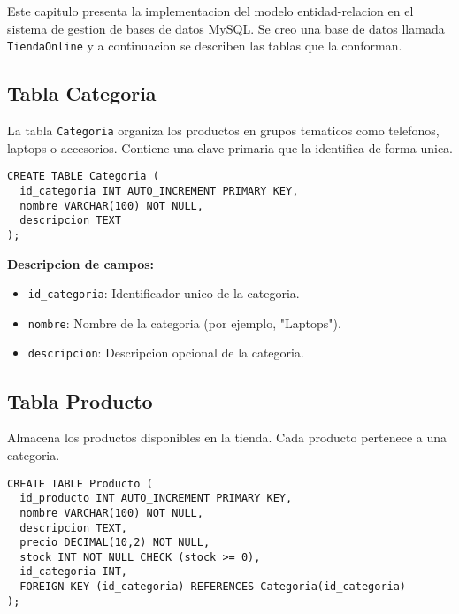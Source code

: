 






Este capitulo presenta la implementacion del modelo entidad-relacion en el sistema de gestion de bases de datos MySQL. Se creo una base de datos llamada \texttt{TiendaOnline} y a continuacion se describen las tablas que la conforman.

\subsection{Tabla Categoria}

La tabla \texttt{Categoria} organiza los productos en grupos tematicos como telefonos, laptops o accesorios. Contiene una clave primaria que la identifica de forma unica.

\begin{lstlisting}
CREATE TABLE Categoria (
  id_categoria INT AUTO_INCREMENT PRIMARY KEY,
  nombre VARCHAR(100) NOT NULL,
  descripcion TEXT
);
\end{lstlisting}

\textbf{Descripcion de campos:}

\begin{itemize}
  \item \texttt{id\_categoria}: Identificador unico de la categoria.
  \item \texttt{nombre}: Nombre de la categoria (por ejemplo, "Laptops").
  \item \texttt{descripcion}: Descripcion opcional de la categoria.
\end{itemize}

\subsection{Tabla Producto}

Almacena los productos disponibles en la tienda. Cada producto pertenece a una categoria.

\begin{lstlisting}
CREATE TABLE Producto (
  id_producto INT AUTO_INCREMENT PRIMARY KEY,
  nombre VARCHAR(100) NOT NULL,
  descripcion TEXT,
  precio DECIMAL(10,2) NOT NULL,
  stock INT NOT NULL CHECK (stock >= 0),
  id_categoria INT,
  FOREIGN KEY (id_categoria) REFERENCES Categoria(id_categoria)
);
\end{lstlisting}

